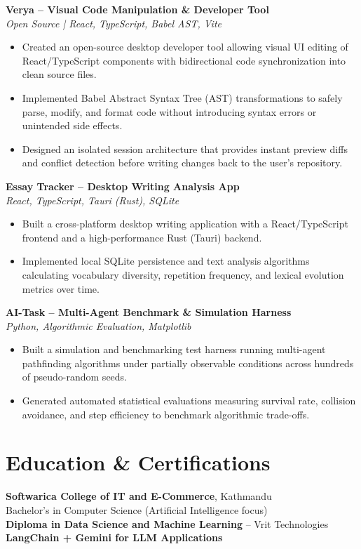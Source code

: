 \documentclass[a4paper,10pt]{article}
\begin{document}
\vspace{3pt}
\textbf{Verya -- Visual Code Manipulation \& Developer Tool} \\
\textit{Open Source | React, TypeScript, Babel AST, Vite}
\begin{itemize}
    \item Created an open-source desktop developer tool allowing visual UI editing of React/TypeScript components with bidirectional code synchronization into clean source files.
    \item Implemented Babel Abstract Syntax Tree (AST) transformations to safely parse, modify, and format code without introducing syntax errors or unintended side effects.
    \item Designed an isolated session architecture that provides instant preview diffs and conflict detection before writing changes back to the user's repository.
\end{itemize}

\vspace{3pt}
\textbf{Essay Tracker -- Desktop Writing Analysis App} \\
\textit{React, TypeScript, Tauri (Rust), SQLite}
\begin{itemize}
    \item Built a cross-platform desktop writing application with a React/TypeScript frontend and a high-performance Rust (Tauri) backend.
    \item Implemented local SQLite persistence and text analysis algorithms calculating vocabulary diversity, repetition frequency, and lexical evolution metrics over time.
\end{itemize}

\vspace{3pt}
\textbf{AI-Task -- Multi-Agent Benchmark \& Simulation Harness} \\
\textit{Python, Algorithmic Evaluation, Matplotlib}
\begin{itemize}
    \item Built a simulation and benchmarking test harness running multi-agent pathfinding algorithms under partially observable conditions across hundreds of pseudo-random seeds.
    \item Generated automated statistical evaluations measuring survival rate, collision avoidance, and step efficiency to benchmark algorithmic trade-offs.
\end{itemize}

\section*{Education \& Certifications}
\textbf{Softwarica College of IT and E-Commerce}, Kathmandu \\
Bachelor's in Computer Science (Artificial Intelligence focus) \\[2pt]
\textbf{Diploma in Data Science and Machine Learning} -- Vrit Technologies \\
\textbf{LangChain + Gemini for LLM Applications}
\end{document}
